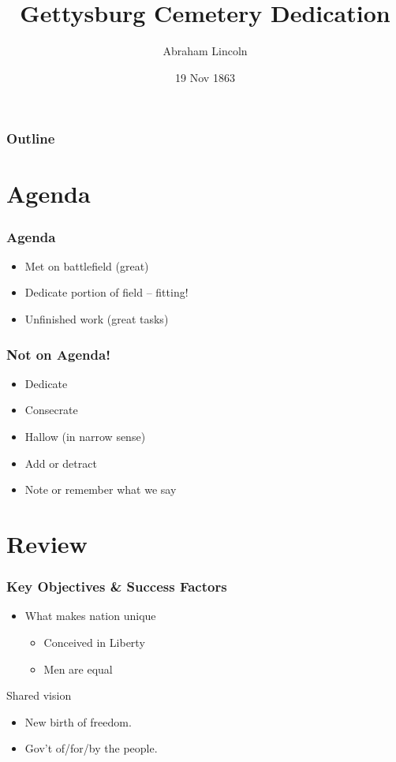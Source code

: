 \documentclass{beamer}
\title{Gettysburg Cemetery Dedication}
\author{Abraham Lincoln}
\institute{United States of America}
\date{19 Nov 1863}
\begin{document}
\begin{frame}
    \titlepage
\end{frame}

\begin{frame}
    \frametitle{Outline}
    \tableofcontents
\end{frame}

\section{Agenda}
\begin{frame}
    \frametitle{Agenda}
    \begin{itemize}
        \item Met on battlefield (great)
        \item Dedicate portion of field -- fitting!
        \item Unfinished work (great tasks)
    \end{itemize}
\end{frame}

\begin{frame}
    \frametitle{Not on Agenda!}
    \begin{itemize}
        \item Dedicate
        \pause \item Consecrate
        \pause \item Hallow (in narrow sense)
        \pause \item Add or detract
        \pause \item Note or remember what we say
    \end{itemize}
\end{frame}

\section{Review}
\begin{frame}
    \frametitle{Key Objectives \& Success Factors}
    \begin{itemize}
        \item What makes nation unique
        \begin{itemize}
            \item Conceived in Liberty
            \item Men are equal
        \end{itemize}
    \end{itemize}
    \begin{block}{Shared vision}
        \begin{itemize}
            \item New birth of freedom.
            \item Gov't of/for/by the people.
        \end{itemize}
    \end{block}
\end{frame}
\end{document}
